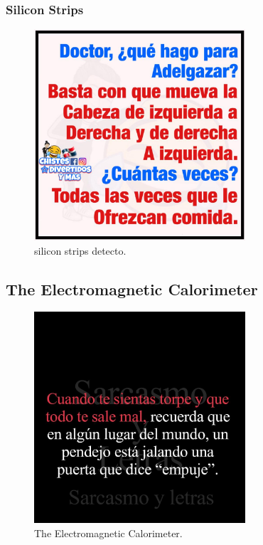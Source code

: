 \subsubsection{Silicon Strips}


\begin{figure}[!h]
  \centering
  \includegraphics[width=0.7\textwidth]{../images/ch2/6}
  \caption[silicon strips detector]{silicon strips detecto.}\label{fig:cms_layout}
\end{figure}


\subsection{The Electromagnetic Calorimeter}


\begin{figure}[!h]
  \centering
  \includegraphics[width=0.7\textwidth]{../images/ch2/7}
  \caption[The Electromagnetic Calorimeter]{ The Electromagnetic Calorimeter.}\label{fig:cms_layout}
\end{figure}
